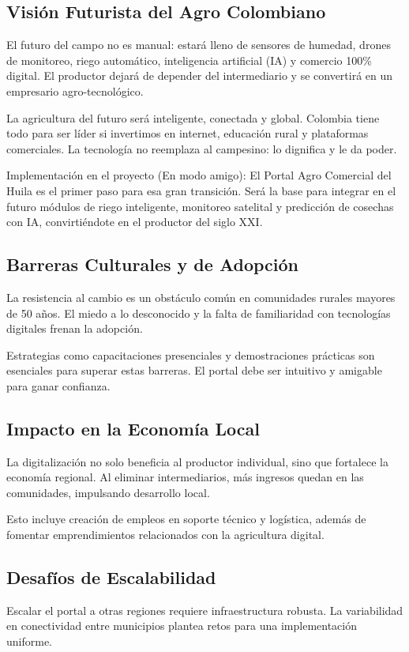 \subsection{Visión Futurista del Agro Colombiano}
El futuro del campo no es manual: estará lleno de sensores de humedad, drones de monitoreo, riego automático, inteligencia artificial (IA) y comercio 100\% digital. El productor dejará de depender del intermediario y se convertirá en un empresario agro-tecnológico.

La agricultura del futuro será inteligente, conectada y global. Colombia tiene todo para ser líder si invertimos en internet, educación rural y plataformas comerciales. La tecnología no reemplaza al campesino: lo dignifica y le da poder.

Implementación en el proyecto (En modo amigo): El Portal Agro Comercial del Huila es el primer paso para esa gran transición. Será la base para integrar en el futuro módulos de riego inteligente, monitoreo satelital y predicción de cosechas con IA, convirtiéndote en el productor del siglo XXI.

\subsection{Barreras Culturales y de Adopción}
La resistencia al cambio es un obstáculo común en comunidades rurales mayores de 50 años. El miedo a lo desconocido y la falta de familiaridad con tecnologías digitales frenan la adopción.

Estrategias como capacitaciones presenciales y demostraciones prácticas son esenciales para superar estas barreras. El portal debe ser intuitivo y amigable para ganar confianza.

\subsection{Impacto en la Economía Local}
La digitalización no solo beneficia al productor individual, sino que fortalece la economía regional. Al eliminar intermediarios, más ingresos quedan en las comunidades, impulsando desarrollo local.

Esto incluye creación de empleos en soporte técnico y logística, además de fomentar emprendimientos relacionados con la agricultura digital.

\subsection{Desafíos de Escalabilidad}
Escalar el portal a otras regiones requiere infraestructura robusta. La variabilidad en conectividad entre municipios plantea retos para una implementación uniforme.


